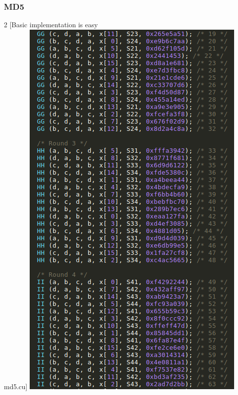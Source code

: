 \documentclass{beamer}
\begin{document}
\begin{frame}
	\frametitle{MD5}
	\begin{multicols}{2}
	[\centering Basic implementation is easy\\
	md5.cu]
		\includegraphics[height=.75\textheight]{md5_1.png}


\end{multicols}
\end{frame}
\end{document}
